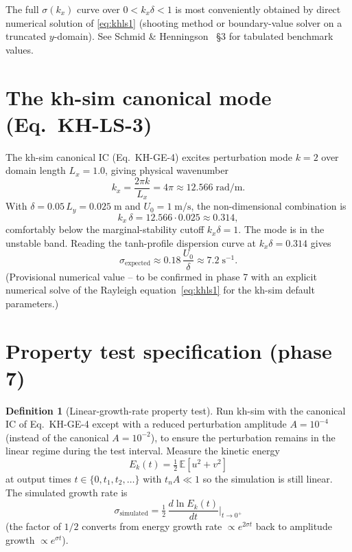 \documentclass[11pt,a4paper]{article}
\theoremstyle{definition}
\newtheorem{definition}{Definition}
\theoremstyle{plain}
\begin{document}
The full $\sigma(k_x)$ curve over $0 < k_x \delta < 1$ is most
conveniently obtained by direct numerical solution of \eqref{eq:khls1}
(shooting method or boundary-value solver on a truncated $y$-domain).
See Schmid \& Henningson~\cite{SchmidHenningson2001} \S 3 for tabulated
benchmark values.

\section{The kh-sim canonical mode (Eq.\ KH-LS-3)}

The kh-sim canonical IC (Eq.\ KH-GE-4) excites perturbation mode
$k = 2$ over domain length $L_x = 1.0$, giving physical wavenumber
\[
k_x = \frac{2\pi k}{L_x} = 4\pi \approx 12.566\;\text{rad/m}.
\]
With $\delta = 0.05\,L_y = 0.025\;\text{m}$ and $U_0 = 1\;\text{m/s}$,
the non-dimensional combination is
\[
k_x\,\delta = 12.566 \cdot 0.025 \approx 0.314,
\]
comfortably below the marginal-stability cutoff $k_x \delta = 1$.
The mode is in the unstable band. Reading the tanh-profile dispersion
curve at $k_x \delta = 0.314$ gives
\begin{equation}
\label{eq:khls3}
\sigma_{\text{expected}} \approx 0.18\,\frac{U_0}{\delta}
\approx 7.2\;\text{s}^{-1}.
\tag{KH-LS-3}
\end{equation}
(Provisional numerical value -- to be confirmed in phase 7 with an
explicit numerical solve of the Rayleigh equation~\eqref{eq:khls1}
for the kh-sim default parameters.)

\section{Property test specification (phase 7)}

\begin{definition}[Linear-growth-rate property test]
Run kh-sim with the canonical IC of Eq.\ KH-GE-4 except with a
reduced perturbation amplitude $A = 10^{-4}$ (instead of the canonical
$A = 10^{-2}$), to ensure the perturbation remains in the linear
regime during the test interval. Measure the kinetic energy
\[
E_k(t) = \tfrac{1}{2}\,\mathbb{E}\!\left[ u^2 + v^2 \right]
\]
at output times $t \in \{0, t_1, t_2, \ldots\}$ with $t_n A \ll 1$ so
the simulation is still linear. The simulated growth rate is
\[
\sigma_{\text{simulated}} = \tfrac{1}{2}\,\frac{d\ln E_k(t)}{dt}\bigg|_{t \to 0^+}
\]
(the factor of $1/2$ converts from energy growth rate $\propto e^{2\sigma t}$
back to amplitude growth $\propto e^{\sigma t}$).
\end{definition}
\end{document}
